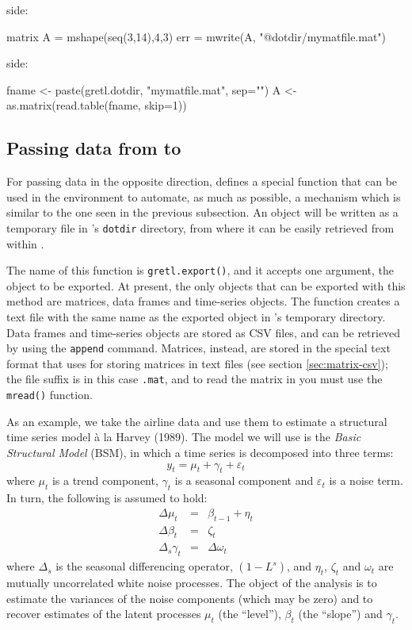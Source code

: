  side:
\begin{code}
  matrix A = mshape(seq(3,14),4,3)
  err = mwrite(A, "@dotdir/mymatfile.mat")
\end{code}
 side:
\begin{code}
  fname <- paste(gretl.dotdir, "mymatfile.mat", sep="")
  A <- as.matrix(read.table(fname, skip=1))
\end{code}

\subsection{Passing data from  to }
\label{sec:Rpassing-data}

For passing data in the opposite direction,  defines a
special function that can be used in the  environment to
automate, as much as possible, a mechanism which is similar to the one
seen in the previous subsection. An  object will be written as
a temporary file in 's \texttt{dotdir} directory, from
where it can be easily retrieved from within .

The name of this function is \texttt{gretl.export()}, and it accepts
one argument, the object to be exported. At present, the only objects
that can be exported with this method are matrices, data frames and
time-series objects. The function creates a text file with the same
name as the exported object in 's temporary directory. Data
frames and time-series objects are stored as CSV files, and can be
retrieved by using the \texttt{append} command. Matrices, instead, are
stored in the special text format that  uses for storing
matrices in text files (see section \ref{sec:matrix-csv}); the file
suffix is in this case \texttt{.mat}, and to read the matrix in
 you must use the \texttt{mread()} function.

As an example, we take the airline data and use them to estimate a
structural time series model \`a la Harvey (1989). The model we will 
use is the \emph{Basic Structural Model} (BSM), in which a time series
is decomposed into three terms:
\[
  y_t = \mu_t + \gamma_t + \varepsilon_t
\]
where $\mu_t$ is a trend component, $\gamma_t$ is a seasonal component
and $\varepsilon_t$ is a noise term. In turn, the following is assumed
to hold:
\begin{eqnarray*}
  \Delta \mu_t & = & \beta_{t-1} + \eta_t \\
  \Delta \beta_t & = & \zeta_t \\
  \Delta_s \gamma_t & = & \Delta \omega_t
\end{eqnarray*}
where $\Delta_s$ is the seasonal differencing operator, $(1-L^s)$, and
$\eta_t$, $\zeta_t$ and $\omega_t$ are mutually uncorrelated white
noise processes. The object of the analysis is to estimate the
variances of the noise components (which may be zero) and to recover
estimates of the latent processes $\mu_t$ (the ``level''), $\beta_t$
(the ``slope'') and $\gamma_t$.

